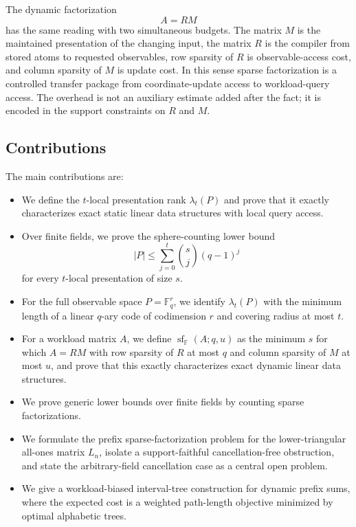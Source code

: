 \documentclass[11pt]{article}
\begin{document}
The dynamic factorization
\[
A=RM
\]
has the same reading with two simultaneous budgets.  The matrix \(M\) is the maintained presentation of the changing input, the matrix \(R\) is the compiler from stored atoms to requested observables, row sparsity of \(R\) is observable-access cost, and column sparsity of \(M\) is update cost.  In this sense sparse factorization is a controlled transfer package from coordinate-update access to workload-query access.  The overhead is not an auxiliary estimate added after the fact; it is encoded in the support constraints on \(R\) and \(M\).

\subsection{Contributions}

The main contributions are:
\begin{itemize}
\item We define the $t$-local presentation rank $\lambda_t(P)$ and prove that it exactly characterizes exact static linear data structures with local query access.
\item Over finite fields, we prove the sphere-counting lower bound
\[
|P|\le \sum_{j=0}^t {s\choose j}(q-1)^j
\]
for every $t$-local presentation of size $s$.
\item For the full observable space $P=\mathbb F_q^r$, we identify $\lambda_t(P)$ with the minimum length of a linear $q$-ary code of codimension $r$ and covering radius at most $t$.
\item For a workload matrix $A$, we define $\operatorname{sf}_{\mathbb F}(A;q,u)$ as the minimum $s$ for which $A=RM$ with row sparsity of $R$ at most $q$ and column sparsity of $M$ at most $u$, and prove that this exactly characterizes exact dynamic linear data structures.
\item We prove generic lower bounds over finite fields by counting sparse factorizations.
\item We formulate the prefix sparse-factorization problem for the lower-triangular all-ones matrix $L_n$, isolate a support-faithful cancellation-free obstruction, and state the arbitrary-field cancellation case as a central open problem.
\item We give a workload-biased interval-tree construction for dynamic prefix sums, where the expected cost is a weighted path-length objective minimized by optimal alphabetic trees.
\end{itemize}
\end{document}
